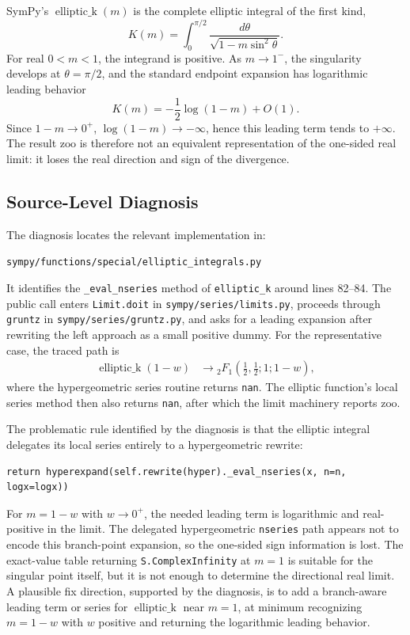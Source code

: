 \documentclass[11pt]{article}
\begin{document}
SymPy's \(\operatorname{elliptic\_k}(m)\) is the complete elliptic integral of the first kind,
\[
K(m)=\int_0^{\pi/2}\frac{d\theta}{\sqrt{1-m\sin^2\theta}}.
\]
For real \(0<m<1\), the integrand is positive. As \(m\to 1^-\), the singularity develops at \(\theta=\pi/2\), and the standard endpoint expansion has logarithmic leading behavior
\[
K(m) = -\frac{1}{2}\log(1-m) + O(1).
\]
Since \(1-m\to 0^+\), \(\log(1-m)\to -\infty\), hence this leading term tends to \(+\infty\). The result \(\mathrm{zoo}\) is therefore not an equivalent representation of the one-sided real limit: it loses the real direction and sign of the divergence.

\subsection{Source-Level Diagnosis}

The diagnosis locates the relevant implementation in:
\begin{center}
\nolinkurl{sympy/functions/special/elliptic_integrals.py}
\end{center}
It identifies the \texttt{\_eval\_nseries} method of \texttt{elliptic\_k} around lines 82--84. The public call enters \texttt{Limit.doit} in \nolinkurl{sympy/series/limits.py}, proceeds through \texttt{gruntz} in \nolinkurl{sympy/series/gruntz.py}, and asks for a leading expansion after rewriting the left approach as a small positive dummy. For the representative case, the traced path is
\[
\begin{aligned}
\operatorname{elliptic\_k}(1-w)
&\longrightarrow
{}_2F_1\!\left(\frac12,\frac12;1;1-w\right),
\end{aligned}
\]
where the hypergeometric series routine returns \texttt{nan}. The elliptic function's local series method then also returns \texttt{nan}, after which the limit machinery reports \(\mathrm{zoo}\).

The problematic rule identified by the diagnosis is that the elliptic integral delegates its local series entirely to a hypergeometric rewrite:

\begin{lstlisting}[style=bugpython]
return hyperexpand(self.rewrite(hyper)._eval_nseries(x, n=n, logx=logx))
\end{lstlisting}

For \(m=1-w\) with \(w\to0^+\), the needed leading term is logarithmic and real-positive in the limit. The delegated hypergeometric \texttt{nseries} path appears not to encode this branch-point expansion, so the one-sided sign information is lost. The exact-value table returning \texttt{S.ComplexInfinity} at \(m=1\) is suitable for the singular point itself, but it is not enough to determine the directional real limit. A plausible fix direction, supported by the diagnosis, is to add a branch-aware leading term or series for \(\operatorname{elliptic\_k}\) near \(m=1\), at minimum recognizing \(m=1-w\) with \(w\) positive and returning the logarithmic leading behavior.
\end{document}
